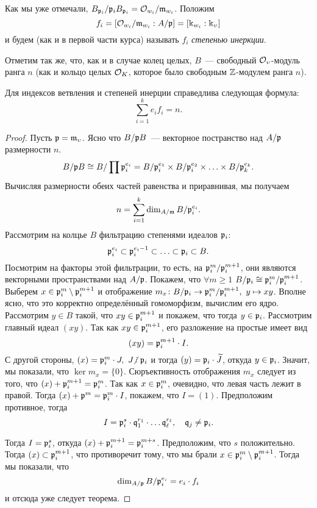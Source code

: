 	Как мы уже отмечали, $B_{\mathfrak{p}_i} /\mathfrak{p}_i B_{\mathfrak{p}_i} = \mathcal{O}_{w_i}/\mathfrak{m}_{w_i}$. Положим 
	\[
		f_i = [\mathcal{O}_{w_i}/\mathfrak{m}_{w_i} : A/\mathfrak{p}] = [\Bbbk_{w_i} : \Bbbk_{\upsilon}] 
	\]
	и будем (как и в первой части курса) называть $f_i$ \emph{степенью инеркции}.

	Отметим так же, что, как и в случае колец целых, $B$~--- свободный $\mathcal{O}_{\upsilon}$-модуль ранга $n$ (как и кольцо целых $\mathcal{O}_{K}$, которое было свободным $\mathbb{Z}$-модулем ранга $n$).


	\begin{theorem} 
		Для индексов ветвления и степеней инерции справедлива следующая формула: 
		\[
			\sum_{i = 1}^{k} e_i f_i = n.
		\]
	\end{theorem}
	\begin{proof}
		Пусть $\mathfrak{p} = \mathfrak{m}_{\upsilon}$. Ясно что $B/\mathfrak{p} B$~--- векторное постранство над $A/\mathfrak{p}$ размерности $n$. 
		\[
			B/\mathfrak{p} B \cong B/\prod \mathfrak{p}_i^{e_i} = B/\mathfrak{p}_{i}^{e_1} \times  B/\mathfrak{p}_{i}^{e_2} \times \ldots \times  B/\mathfrak{p}_{k}^{e_k}.
		\]
		Вычисляя размерности обеих частей равенства и приравнивая, мы получаем 
		\[
			n = \sum_{i = 1}^{k} \dim_{A/\mathfrak{m}} B/\mathfrak{p}_i^{e_i}.
		\]
		Рассмотрим на колцье $B$ фильтрацию степенями идеалов $\mathfrak{p}_i$:
		\[
			\mathfrak{p}_{i}^{e_i} \subset \mathfrak{p}_i^{e_i - 1} \subset \ldots \subset \mathfrak{p}_i \subset B.
		\]
		Посмотрим на факторы этой фильтрации, то есть, на  $\mathfrak{p}_{i}^{m}/\mathfrak{p}_{i}^{m + 1}$, они являются векторными пространствами над $A/\mathfrak{p}$. Покажем, что $\forall m \ge 1$ $B/\mathfrak{p}_i \cong \mathfrak{p}_i^m / \mathfrak{p}_i^{m + 1}$. Выберем $x \in \mathfrak{p}_i^{m}\setminus \mathfrak{p}_{i}^{m + 1}$ и отображение $m_{x}\colon B/\mathfrak{p}_i \to \mathfrak{p}_i^m/\mathfrak{p}_i^{m + 1}, \ y \mapsto xy$. Вполне ясно, что это корректно определённый гомоморфизм, вычислим его ядро.  Рассмотрим $y \in B$ такой, что $xy \in \mathfrak{p}_i^{m + 1}$ и покажем, что тогда $y \in \mathfrak{p}_i$. Рассмотрим главный идеал $(xy)$. Так как $xy \in \mathfrak{p}_i^{m + 1}$, его разложение на простые имеет вид 
		\[
			(xy) = \mathfrak{p}_i^{m + 1} \cdot I.
		\]
		С другой стороны, $(x) = \fp_i^{m} \cdot J, \ J \notdivby \fp_i$ и тогда  $(y) = \mathfrak{p}_i \cdot \widetilde{J}$, откуда $y \in \mathfrak{p}_i$. Значит, мы показали, что $\ker{m_{x}} = \{ 0\}$. Сюръективность отображения $m_{x}$ следует из того, что $(x) + \mathfrak{p}_{i}^{m + 1} = \mathfrak{p}_{i}^m$. Так как $x \in \mathfrak{p}_i^m$, очевидно, что левая часть лежит в правой. Тогда $(x) + \mathfrak{p}^{m} =  \mathfrak{p}_i^m \cdot I$, покажем, что $I = (1)$. Предположим противное, тогда 
		\[
			I = \mathfrak{p}_i^{s} \cdot \mathfrak{q}_{1}^{r_1} \cdot \ldots \mathfrak{q}_{\ell}^{r_{\ell}}, \quad \mathfrak{q}_j \neq \mathfrak{p}_i.
		\]

		Тогда $I = \mathfrak{p}_{i}^{s}$, откуда $(x) + \mathfrak{p}_{i}^{m + 1} = \mathfrak{p}_{i}^{m + s}$. Предположим, что $s$ положительно. Тогда $(x) \subset \mathfrak{p}_i^{m + 1}$, что противоречит тому, что мы брали $x \in \mathfrak{p}_i^{m}\setminus \mathfrak{p}_{i}^{m + 1}$. Тогда мы показали, что 
		\[
			\dim_{A/\mathfrak{p}} B/\mathfrak{p}_{i}^{e_i} = e_i \cdot f_i
		\]
		и отсюда уже следует теорема. 
	\end{proof}

